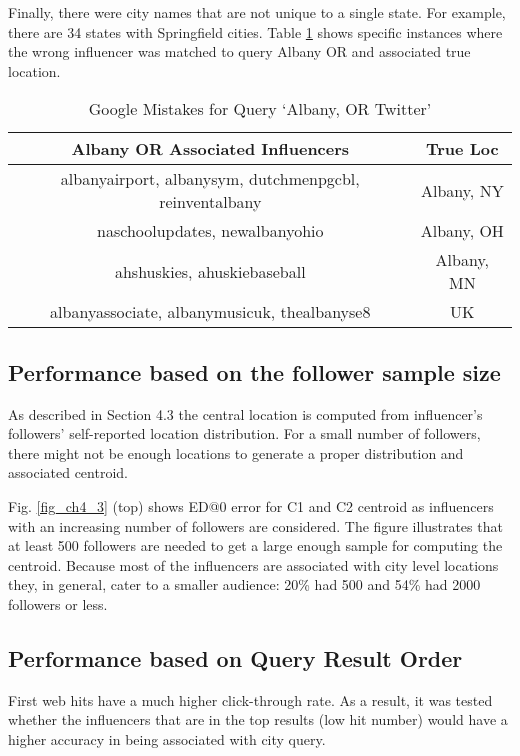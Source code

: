 Finally, there were city names that are not unique to a single state. For example, there are 34 states with Springfield cities. Table \ref{table_4_5} shows specific instances where the wrong influencer was matched to query Albany OR and associated true location.

\begin{table}
\small
\caption{Google Mistakes for Query `Albany, OR Twitter'}
\label{table_4_5}
\begin{center}
\tabcolsep=0.15cm
\begin{tabular}{|c|c|}
\hline
\bfseries Albany OR Associated Influencers & \bfseries True Loc\\
\hline
albanyairport, albanysym, dutchmenpgcbl, reinventalbany &Albany, NY\\
\hline
naschoolupdates, newalbanyohio&Albany, OH\\
\hline
ahshuskies, ahuskiebaseball&Albany, MN\\
\hline
albanyassociate, albanymusicuk, thealbanyse8&UK\\
\hline
\end{tabular}
\end{center}
\end{table}

\subsection{Performance based on the follower sample size}

As described in Section 4.3 the central location is computed from influencer's followers' self-reported location distribution. For a small number of followers, there might not be enough locations to generate a proper distribution and associated centroid.

Fig. \ref{fig_ch4_3} (top) shows ED@0 error for C1 and C2 centroid as influencers with an increasing number of followers are considered. The figure illustrates that at least 500 followers are needed to get a large enough sample for computing the centroid. Because most of the influencers are associated with city level locations they, in general, cater to a smaller audience: 20\% had 500 and 54\% had 2000 followers or less.

\subsection{Performance based on Query Result Order}

First web hits have a much higher click-through rate. As a result, it was tested whether the influencers that are in the top results (low hit number) would have a higher accuracy in being associated with city query. 

